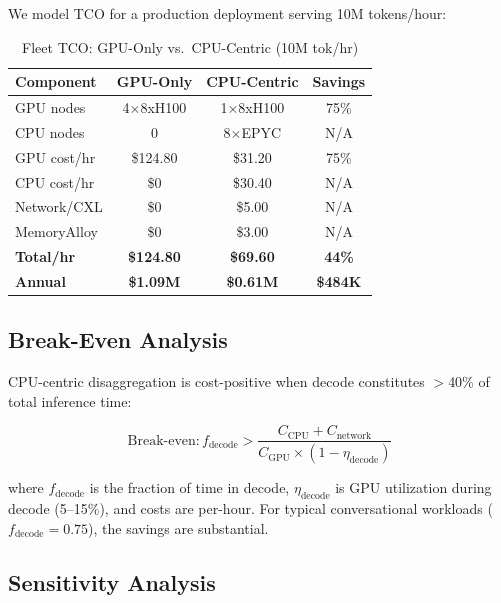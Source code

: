 \documentclass[conference,10pt]{IEEEtran}
\begin{document}
We model TCO for a production deployment serving 10M tokens/hour:

\begin{table}[!htbp]
\caption{Fleet TCO: GPU-Only vs.\ CPU-Centric (10M tok/hr)}
\label{tab:tco}
\centering\footnotesize
\begin{tabular}{@{}lccc@{}}
\toprule
\textbf{Component} & \textbf{GPU-Only} & \textbf{CPU-Centric} & \textbf{Savings} \\
\midrule
GPU nodes & 4$\times$8xH100 & 1$\times$8xH100 & 75\% \\
CPU nodes & 0 & 8$\times$EPYC & N/A \\
GPU cost/hr & \$124.80 & \$31.20 & 75\% \\
CPU cost/hr & \$0 & \$30.40 & N/A \\
Network/CXL & \$0 & \$5.00 & N/A \\
MemoryAlloy & \$0 & \$3.00 & N/A \\
\midrule
\textbf{Total/hr} & \textbf{\$124.80} & \textbf{\$69.60} & \textbf{44\%} \\
\textbf{Annual} & \textbf{\$1.09M} & \textbf{\$0.61M} & \textbf{\$484K} \\
\bottomrule
\end{tabular}
\end{table}

\subsection{Break-Even Analysis}

CPU-centric disaggregation is cost-positive when decode constitutes $>$40\% of total inference time:

\begin{equation}
\text{Break-even}: f_{\text{decode}} > \frac{C_{\text{CPU}} + C_{\text{network}}}{C_{\text{GPU}} \times (1 - \eta_{\text{decode}})}
\end{equation}

\noindent where $f_{\text{decode}}$ is the fraction of time in decode, $\eta_{\text{decode}}$ is GPU utilization during decode (5--15\%), and costs are per-hour. For typical conversational workloads ($f_{\text{decode}} = 0.75$), the savings are substantial.

\subsection{Sensitivity Analysis}
\end{document}
